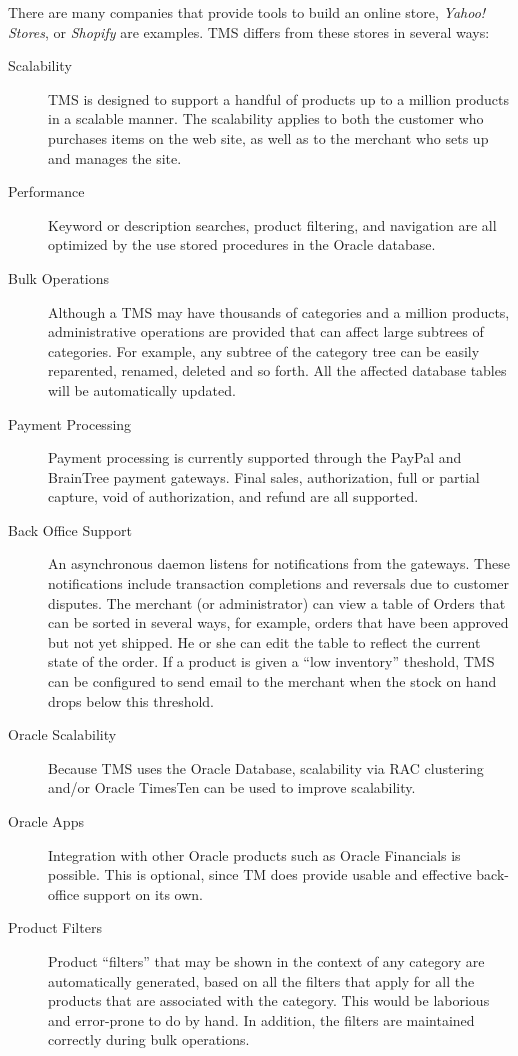 \documentclass[letterpaper, 12pt]{article}
\begin{document}
There are many companies that provide tools to build an online store,  {\em Yahoo! Stores}, or {\em Shopify} are examples.  TMS differs from these stores in several ways:
\begin{description}
 \item[Scalability]  TMS is designed to support a handful of products up to a million products in a scalable manner.  The scalability applies to both the customer who purchases items on the web site, as well as to the merchant who sets up and manages the site. 
\item[Performance] Keyword or description searches, product filtering, and navigation are all optimized by the use stored procedures in the Oracle database.  
\item[Bulk Operations] Although a TMS may have thousands of categories and a million products, administrative operations are provided that can affect large subtrees of categories.  For example, any subtree of the category tree can be easily reparented, renamed, deleted and so forth.  All the affected database tables will be automatically updated.  
\item[Payment Processing] Payment processing is currently supported through the PayPal and BrainTree payment gateways.  Final sales, authorization, full or partial capture, void of authorization, and refund are all supported.  
\item[Back Office Support] An asynchronous daemon listens for notifications from the gateways.  These notifications include transaction completions and reversals due to customer disputes.  The merchant (or administrator) can view a table of Orders that can be sorted in several ways, for example, orders that have been approved but not yet shipped.  He or she can edit the table to reflect the current state of the order.
If a product is given a ``low inventory'' theshold, TMS can be configured to send email to the merchant when the stock on hand drops below this threshold.
\item[Oracle Scalability] Because  TMS uses the Oracle Database, scalability via RAC clustering and/or Oracle TimesTen can be used to improve scalability. 
\item[Oracle Apps] Integration with other Oracle products such as Oracle Financials is possible.  This is optional, since TM does provide usable and effective back-office support on its own.
\item[Product Filters] Product ``filters'' that may be shown in the context of any category are automatically generated, based on all the filters that apply for all the products that are associated with the category.   This would be laborious and error-prone to do by hand.  In addition, the filters are maintained correctly during bulk operations.

\end{description}
\end{document}
